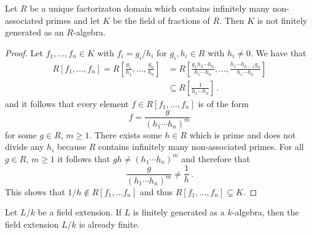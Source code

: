 \begin{lemma}
  \label{lemma: field of fractions finitely generated}
  Let $R$ be a unique factorizaton domain which contains infinitely many non-associated primes and let $K$ be the field of fractions of $R$.
  Then $K$ is not finitely generated as an $R$-algebra.
\end{lemma}


\begin{proof}
  
  Let $f_1, \dotsc, f_n \in K$ with $f_i = g_i/h_i$ for $g_i, h_i \in R$ with $h_i \neq 0$.
  We have that
  \begin{align*}
                R[f_1, \dotsc, f_n]
     =          R\left[ \frac{g_1}{h_1}, \dotsc, \frac{g_n}{h_n} \right]
    &=          R\left[
                  \frac{g_1 h_2 \dotsm h_n}{h_1 \dotsm h_n},
                  \dotsc,
                  \frac{h_1 \dotsm h_{n-1} g_n}{h_1 \dotsm h_n}
                \right] \\
    &\subseteq  R\left[ \frac{1}{h_1 \dotsm h_n} \right] \,.
  \end{align*}
  and it follows that every element $f \in R[f_1, \dotsc, f_n]$ is of the form
  \[
      f
    = \frac{g}{(h_1 \dotsm h_n)^m}
  \]
  for some $g \in R$, $m \geq 1$.
  There exists some $h \in R$ which is prime and does not divide any $h_i$ because $R$ contains infinitely many non-associated primes.
  For all $g \in R$, $m \geq 1$ it follows that $gh \neq (h_1 \dotsm h_n)^m$ and therefore that
  \[
    \frac{g}{(h_1 \dotsm h_n)^m} \neq \frac{1}{h} \,.
  \]
  This shows that $1/h \notin R[f_1, \dotsc f_n]$ and thus $R[f_1, \dotsc, f_n] \subsetneq K$.
\end{proof}


\begin{corollary}
  \label{corollary: finitely generated field extensions are finite}
  Let $L/k$ be a field extension.
  If $L$ is finitely generated as a $k$-algebra, then the field extension $L/k$ is already finite.
\end{corollary}


